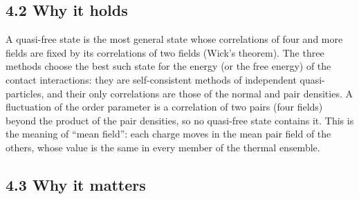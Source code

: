 \documentclass[
  10pt,
]{article}
\begin{document}
\hypertarget{why-it-holds}{%
\subsection{4.2 Why it holds}\label{why-it-holds}}

A quasi-free state is the most general state whose correlations of four
and more fields are fixed by its correlations of two fields (Wick's
theorem). The three methods choose the best such state for the energy
(or the free energy) of the contact interactions: they are
self-consistent methods of independent quasi-particles, and their only
correlations are those of the normal and pair densities. A fluctuation
of the order parameter is a correlation of two pairs (four fields)
beyond the product of the pair densities, so no quasi-free state
contains it. This is the meaning of ``mean field'': each charge moves in
the mean pair field of the others, whose value is the same in every
member of the thermal ensemble.

\hypertarget{why-it-matters-2}{%
\subsection{4.3 Why it matters}\label{why-it-matters-2}}
\end{document}

